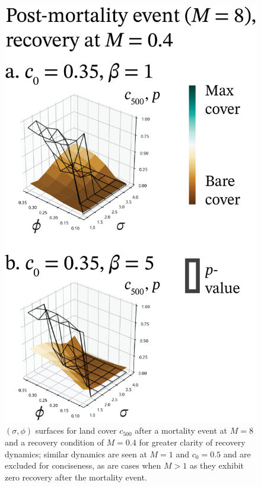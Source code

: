 \documentclass[10pt]{article}
\begin{document}
\begin{figure}
 	\begin{center}
		\includegraphics{f5_cover_results_dist.png}
	\end{center}
		\caption{$(\sigma,\phi)$ surfaces for land cover $c_{500}$ after a mortality event at $M = 8$ and a recovery condition of $M = 0.4$ for greater clarity of recovery dynamics; similar dynamics are seen at $M = 1$ and $c_0 = 0.5$ and are excluded for conciseness, as are cases when $M > 1$ as they exhibit zero recovery after the mortality event.}
\end{figure}
\end{document}
